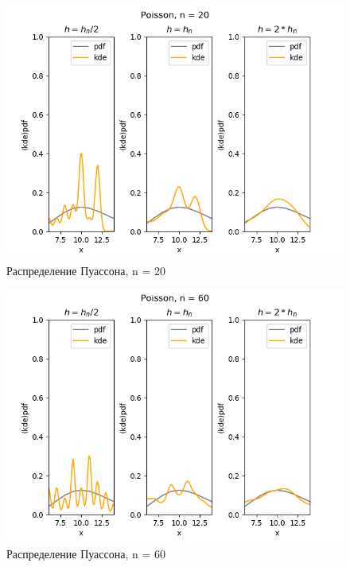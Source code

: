 \documentclass[../body.tex]{subfiles}
\begin{document}
\begin{figure}[H]
	\centering
	\includegraphics[width=\textwidth, height =0.4\textheight]{img/PoissonKDE n = 20.png}
	\caption{Распределение Пуассона, n = 20}
	\label{fig:poisson_kde_20}
\end{figure}

\begin{figure}[H]
	\centering
	\includegraphics[width=\textwidth, height =0.4\textheight]{img/PoissonKDE n = 60.png}
	\caption{Распределение Пуассона, n = 60}
	\label{fig:poisson_kde_60}
\end{figure}
\end{document}
